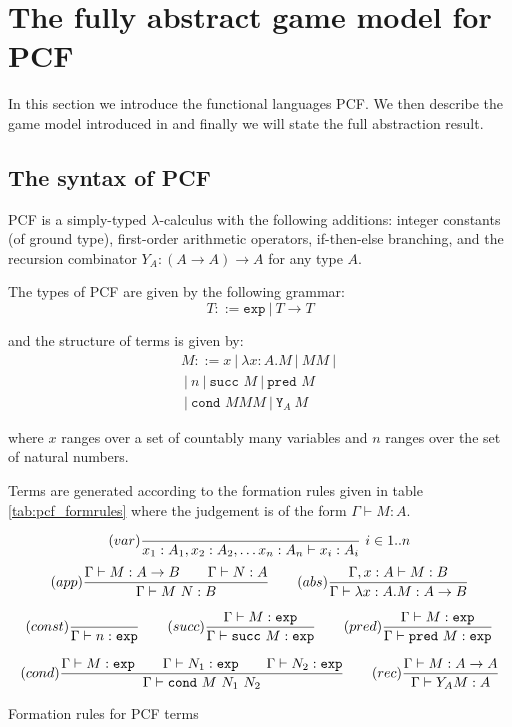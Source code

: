 \section{The fully abstract game model for PCF}

In this section we introduce the functional languages PCF. We then
describe the game model introduced in \cite{abramsky94full} and
finally we will state the full abstraction result.

\subsection{The syntax of PCF}
PCF is a simply-typed $\lambda$-calculus with the following
additions: integer constants  (of ground type), first-order
arithmetic operators, if-then-else branching, and the recursion
combinator $Y_A : (A\rightarrow A)\rightarrow A$ for any type $A$.

The types of PCF are given by the following grammar:
$$ T ::= \texttt{exp}\ |\ T \rightarrow T$$

and the structure of terms is given by:
\begin{eqnarray*}
 M ::= x\ |\ \lambda x :A . M \ |\ M M \ |\ \\
\ |\ n \ |\ \texttt{succ } M \ |\  \texttt{pred } M \\
\ |\ \texttt{cond } M M M \ |\ \texttt{Y}_A\ M
\end{eqnarray*}

where $x$ ranges over a set of countably many variables and $n$
ranges over the set of natural numbers.

Terms are generated according to the formation rules given in table
\ref{tab:pcf_formrules} where the judgement is of the form $ \Gamma  \vdash M : A$.

\begin{table}[htbp]
$$ (var) \frac{\displaystyle }{x_1:A_1, x_2:A_2, \ldots x_n : A_n  \vdash x_i : A_i}\ i \in 1..n$$
$$ (app) \frac{\displaystyle \Gamma \vdash M : A\rightarrow B \qquad \Gamma \vdash N:A}{\Gamma \vdash M\ N : B}
\qquad (abs) \frac{\displaystyle \Gamma, x:A \vdash M : B}{\Gamma \vdash \lambda x :A . M : A\rightarrow B}$$

$$ (const) \frac{\displaystyle }{\Gamma \vdash n :\texttt{exp}}
\qquad (succ) \frac{\displaystyle \Gamma \vdash M:\texttt{exp} }{\Gamma \vdash \texttt{succ}\ M:\texttt{exp}}
\qquad (pred) \frac{\displaystyle \Gamma \vdash M:\texttt{exp} }{\Gamma \vdash \texttt{pred}\ M:\texttt{exp}}$$

$$
(cond) \frac{\displaystyle \Gamma \vdash M : \texttt{exp} \qquad \Gamma \vdash N_1 : \texttt{exp} \qquad \Gamma \vdash N_2 : \texttt{exp} }{\Gamma \vdash \texttt{cond}\ M\ N_1\ N_2}
\qquad  (rec) \frac{\displaystyle \Gamma \vdash M : A\rightarrow A }{ \Gamma \vdash Y_A M : A}$$

\caption{Formation rules for PCF terms}
\label{tab:pcf_formrules}
\end{table}

